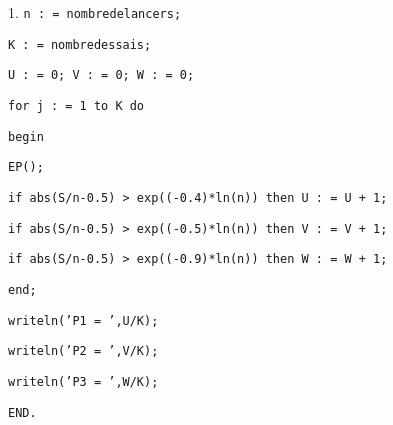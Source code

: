 \documentclass[11pt]{article}%
\begin{document}
\begin{noliste}{1.}
\texttt{\hspace{1cm}n : = nombredelancers;}

\texttt{\hspace{1cm}K : = nombredessais;}

\texttt{\hspace{1cm}U : = 0; V : = 0; W : = 0;}

\texttt{\hspace{1cm}for j : = 1 to K do}

\texttt{\hspace{1cm}begin}

\texttt{\hspace{2cm}EP\left(\right);}

\texttt{\hspace{2cm}if abs(S/n-0.5) > exp((-0.4)*ln(n)) then
U : = U + 1;}
 
\texttt{\hspace{2cm}if abs(S/n-0.5) > exp((-0.5)*ln(n)) then
V : = V + 1;}

\texttt{\hspace{2cm}if abs(S/n-0.5) > exp((-0.9)*ln(n)) then
W : = W + 1;}

\texttt{\hspace{1cm}end;}

\texttt{\hspace{1cm}writeln('P1 = ',U/K);}

\texttt{\hspace{1cm}writeln('P2 = ',V/K);}

\texttt{\hspace{1cm}writeln('P3 = ',W/K);}

\texttt{END.}
\end{noliste}
\end{document}
